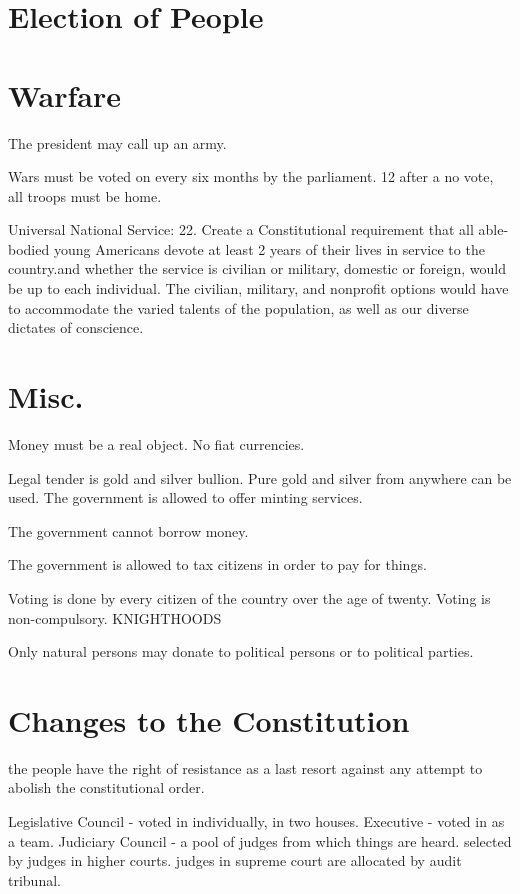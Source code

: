 \documentclass[a4paper]{report}
\begin{document}
\section{Election of People}

\section{Warfare}

The president may call up an army.

Wars must be voted on every six months by the parliament. 12 after a no vote, all troops must be home.

Universal National Service:
22. Create a Constitutional requirement that all able-bodied young Americans devote at least 2 years of their lives in service to the country.and whether the service is civilian or military, domestic or foreign, would be up to each individual. The civilian, military, and nonprofit options would have to accommodate the varied talents of the population, as well as our diverse dictates of conscience. 

\section{Misc.}

Money must be a real object. No fiat currencies.

Legal tender is gold and silver bullion.
Pure gold and silver from anywhere can be used.
The government is allowed to offer minting services.

The government cannot borrow money.

The government is allowed to tax citizens in order to pay for things.

Voting is done by every citizen of the country over the age of twenty. Voting is non-compulsory.
KNIGHTHOODS

Only natural persons may donate to political persons or to political parties.

\section{Changes to the Constitution}

the people have the right of resistance as a last resort against any attempt to abolish the constitutional order.



Legislative Council - voted in individually, in two houses.
Executive - voted in as a team.
Judiciary Council - a pool of judges from which things are heard. selected by judges in higher courts. judges in supreme court are allocated by audit tribunal.
\end{document}
